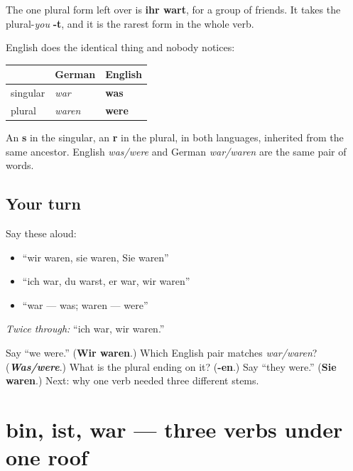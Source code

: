 The one plural form left over is \textbf{ihr wart}, for a group of friends. It takes the plural-\emph{you} \textbf{-t}, and it is the rarest form in the whole verb.

\begin{cousinweb}
English does the identical thing and nobody notices:

\noindent
\begin{tabularx}{\linewidth}{@{}>{\raggedright\arraybackslash}X>{\raggedright\arraybackslash}X>{\raggedright\arraybackslash}X@{}}
\toprule
\textbf{} & \textbf{German} & \textbf{English} \\
\midrule
singular & \emph{war} & \textbf{was} \\
plural & \emph{waren} & \textbf{were} \\
\bottomrule
\end{tabularx}

An \textbf{s} in the singular, an \textbf{r} in the plural, in both languages, inherited from the same ancestor. English \emph{was/were} and German \emph{war/waren} are the same pair of words.
\end{cousinweb}

\subsection*{Your turn}
Say these aloud:

\begin{itemize}
\raggedright
  \item \textquotedblleft{}wir waren, sie waren, Sie waren\textquotedblright{}
  \item \textquotedblleft{}ich war, du warst, er war, wir waren\textquotedblright{}
  \item \textquotedblleft{}war — was; waren — were\textquotedblright{}
\end{itemize}

\emph{Twice through:} \textquotedblleft{}ich war, wir waren.\textquotedblright{}

\begin{tcolorbox}[breakable,colback=teal!4,colframe=teal!35!black,title={Before you move on}]
Say \textquotedblleft{}we were.\textquotedblright{} (\textbf{Wir waren}.) Which English pair matches \emph{war/waren}? (\emph{\textbf{Was/were}}.) What is the plural ending on it? (\textbf{-en}.) Say \textquotedblleft{}they were.\textquotedblright{} (\textbf{Sie waren}.) Next: why one verb needed three different stems.
\end{tcolorbox}
\section[bin, ist, war]{bin, ist, war — three verbs under one roof}

